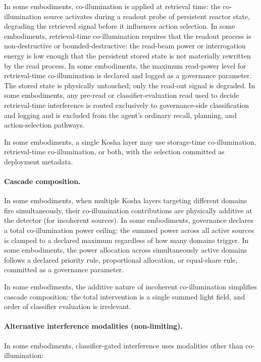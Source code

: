 \documentclass[a4paper,12pt]{article}
\begin{document}
In some embodiments, co-illumination is applied at retrieval time:
the co-illumination source activates during a readout probe of
persistent reactor state, degrading the retrieved signal before it
influences action selection. In some embodiments, retrieval-time
co-illumination requires that the readout process is non-destructive
or bounded-destructive: the read-beam power or interrogation energy
is low enough that the persistent stored state is not materially
rewritten by the read process. In some embodiments, the maximum
read-power level for retrieval-time co-illumination is declared and
logged as a governance parameter. The stored state is physically
untouched; only the read-out signal is degraded. In some embodiments,
any pre-read or classifier-evaluation read used to decide
retrieval-time interference is routed exclusively to governance-side
classification and logging and is excluded from the agent's ordinary
recall, planning, and action-selection pathways.

In some embodiments, a single Kosha layer may use storage-time
co-illumination, retrieval-time co-illumination, or both, with the
selection committed as deployment metadata.

\paragraph{Cascade composition.}
In some embodiments, when multiple Kosha layers targeting different
domains fire simultaneously, their co-illumination contributions are
physically additive at the detector (for incoherent sources). In some
embodiments, governance declares a total co-illumination power
ceiling: the summed power across all active sources is clamped to a
declared maximum regardless of how many domains trigger. In some
embodiments, the power allocation across simultaneously active
domains follows a declared priority rule, proportional allocation, or
equal-share rule, committed as a governance parameter.

In some embodiments, the additive nature of incoherent
co-illumination simplifies cascade composition: the total
intervention is a single summed light field, and order of classifier
evaluation is irrelevant.

\paragraph{Alternative interference modalities (non-limiting).}
In some embodiments, classifier-gated interference uses modalities
other than co-illumination:
\end{document}
